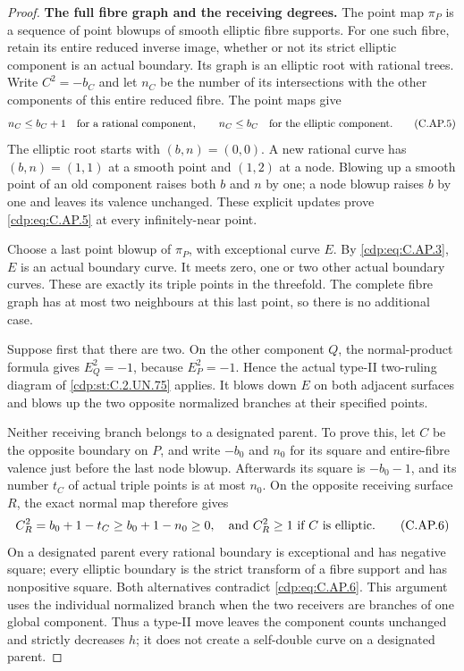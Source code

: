 \begin{proof}
\par\medskip\noindent\textbf{The full fibre graph and the receiving degrees.}
The point map \(\pi_P\) is a sequence of point blowups of
smooth elliptic fibre supports. For one such fibre, retain
its entire reduced inverse image, whether or not its strict
elliptic component is an actual boundary. Its graph is an
elliptic root with rational trees. Write \(C^2=-b_C\) and let
\(n_C\) be the number of its intersections with the other
components of this entire reduced fibre. The point maps give
\[
 n_C\le b_C+1\quad\hbox{for a rational component},\qquad
 n_C\le b_C\quad\hbox{for the elliptic component}.
 \tag{C.AP.5}\label{cdp:eq:C.AP.5}
\]
The elliptic root starts with \((b,n)=(0,0)\). A new rational
curve has \((b,n)=(1,1)\) at a smooth point and \((1,2)\) at
a node. Blowing up a smooth point of an old component raises
both \(b\) and \(n\) by one; a node blowup raises \(b\) by one
and leaves its valence unchanged. These explicit updates
prove \eqref{cdp:eq:C.AP.5} at every infinitely-near point.

Choose a last point blowup of \(\pi_P\), with exceptional
curve \(E\). By \eqref{cdp:eq:C.AP.3}, \(E\) is an actual boundary curve.
It meets zero, one or two other actual boundary curves.
These are exactly its triple points in the threefold.
The complete fibre graph has at most two neighbours at this
last point, so there is no additional case.

Suppose first that there are two. On the other component
\(Q\), the normal-product formula gives \(E_Q^2=-1\), because
\(E_P^2=-1\). Hence the actual type-II two-ruling diagram of
\ref{cdp:st:C.2.UN.75} applies. It blows down \(E\) on both adjacent surfaces
and blows up the two opposite normalized branches at their
specified points.

Neither receiving branch belongs to a designated parent.
To prove this, let \(C\) be the opposite boundary on \(P\),
and write \(-b_0\) and \(n_0\) for its square and entire-fibre
valence just before the last node blowup. Afterwards its
square is \(-b_0-1\), and its number \(t_C\) of actual triple
points is at most \(n_0\). On the opposite receiving surface
\(R\), the exact normal map therefore gives
\[
 C_R^2=b_0+1-t_C\ge b_0+1-n_0\ge0,
 \quad\hbox{and } C_R^2\ge1\hbox{ if }C\hbox{ is elliptic}.
 \tag{C.AP.6}\label{cdp:eq:C.AP.6}
\]
On a designated parent every rational boundary is exceptional
and has negative square; every elliptic boundary is the
strict transform of a fibre support and has nonpositive
square. Both alternatives contradict \eqref{cdp:eq:C.AP.6}. This argument
uses the individual normalized branch when the two receivers
are branches of one global component. Thus a type-II move
leaves the component counts unchanged and strictly decreases
\(h\); it does not create a self-double curve on a designated
parent.


\end{proof}
